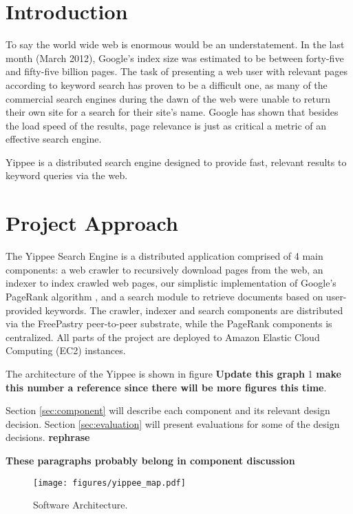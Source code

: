 \documentclass[11pt, letterpaper, oneside, twocolumn]{article}
\begin{document}
\section{ Introduction }

To say the world wide web is enormous would be an understatement.  
In the last month (March 2012),  Google's index size was estimated to be between forty-five and fifty-five billion pages.\cite{websize}
The task of presenting a web user with relevant pages according to keyword search has proven to be a difficult one, as many of the commercial search engines during the dawn of the web were unable to return their own site for a search for their site's name.\cite{google} 
Google has shown that besides the load speed of the results, page relevance is just as critical a metric of an effective search engine. 

Yippee is a distributed search engine designed to provide fast, relevant results to keyword queries via the web.  

\section{Project Approach}
\label{sec:approach}

The Yippee Search Engine is a distributed application comprised of 4 main components: a web crawler to recursively download pages from the web, an indexer to index crawled web pages, our simplistic implementation of Google's PageRank algorithm \cite{pagerank}, and a search module to retrieve documents based on user-provided keywords.  
The crawler, indexer and search components are distributed via the FreePastry peer-to-peer substrate, while the PageRank components is centralized.  All parts of the project are deployed to Amazon Elastic Cloud Computing (EC2) instances.  

The architecture of the Yippee is shown in figure \textbf{Update this graph} 1 \textbf{make this number a reference since there will be more figures this time}.


Section \ref{sec:component} will describe each component and its relevant design decision.
Section \ref{sec:evaluation} will present evaluations for some of the design decisions. \textbf{rephrase}

\textbf{These paragraphs probably belong in component discussion}




\label{sec:SOAR} %
\begin{figure}[!b]
  \centering
  \texttt{[image: figures/yippee\_map.pdf]}
  \caption{Software Architecture.}
\end{figure}
\end{document}

